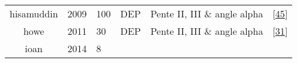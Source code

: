 \documentclass[12pt,]{article}
\begin{document}
\begin{landscape}
\begin{longtable}[]{@{}cllccl@{}}
\begin{minipage}[t]{0.09\columnwidth}\centering
hisamuddin\strut
\end{minipage} & \begin{minipage}[t]{0.05\columnwidth}\raggedright
2009\strut
\end{minipage} & \begin{minipage}[t]{0.08\columnwidth}\raggedright
100\strut
\end{minipage} & \begin{minipage}[t]{0.14\columnwidth}\centering
DEP\strut
\end{minipage} & \begin{minipage}[t]{0.40\columnwidth}\centering
Pente II, III \& angle alpha\strut
\end{minipage} & \begin{minipage}[t]{0.08\columnwidth}\raggedright
{[}\protect\hyperlink{ref-hisamuddin2009correlations}{45}{]}\strut
\end{minipage}\tabularnewline
\begin{minipage}[t]{0.09\columnwidth}\centering
howe\strut
\end{minipage} & \begin{minipage}[t]{0.05\columnwidth}\raggedright
2011\strut
\end{minipage} & \begin{minipage}[t]{0.08\columnwidth}\raggedright
30\strut
\end{minipage} & \begin{minipage}[t]{0.14\columnwidth}\centering
DEP\strut
\end{minipage} & \begin{minipage}[t]{0.40\columnwidth}\centering
Pente II, III \& angle alpha\strut
\end{minipage} & \begin{minipage}[t]{0.08\columnwidth}\raggedright
{[}\protect\hyperlink{ref-howe2011use}{31}{]}\strut
\end{minipage}\tabularnewline
\begin{minipage}[t]{0.09\columnwidth}\centering
ioan\strut
\end{minipage} & \begin{minipage}[t]{0.05\columnwidth}\raggedright
2014\strut
\end{minipage} & \begin{minipage}[t]{0.08\columnwidth}\raggedright
8\strut
\end{minipage} & \begin{minipage}[t]{0.14\columnwidth}\centering

\end{minipage}
\end{longtable}
\end{landscape}
\end{document}
